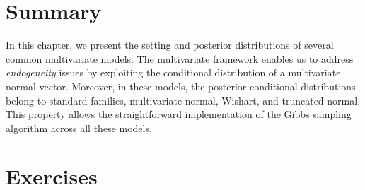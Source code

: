 \section{Summary}\label{sec75}
In this chapter, we present the setting and posterior distributions of several common multivariate models. The multivariate framework enables us to address \textit{endogeneity} issues by exploiting the conditional distribution of a multivariate normal vector. Moreover, in these models, the posterior conditional distributions belong to standard families, multivariate normal, Wishart, and truncated normal. This property allows the straightforward implementation of the Gibbs sampling algorithm across all these models.


\section{Exercises}\label{sec76}
